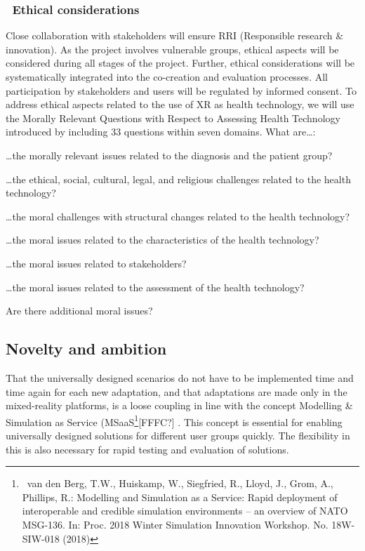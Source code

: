 \subsubsection[\ Ethical considerations]{\ Ethical considerations}
Close collaboration with stakeholders will ensure RRI (Responsible research \& innovation). As the project involves
vulnerable groups, ethical aspects will be considered during all stages of the project. Further, ethical considerations
will be systematically integrated into the co-creation and evaluation processes. All participation by stakeholders and
users will be regulated by informed consent. To address ethical aspects related to the use of XR as health technology,
we will use the Morally Relevant Questions with Respect to Assessing Health Technology introduced by 
\citet{hofmann_droste_oortwijn_cleemput_sacchini_2014}
including 33 questions within seven domains. 
What are\dots: 
\begin{enumerate*}[label={\arabic*.\ },ref=\arabic*]
\item \dots the morally relevant issues related
to the diagnosis and the patient group? 
\item \dots the ethical, social, cultural, legal, and religious challenges related to
the health technology? 
\item \dots the moral challenges with structural changes related to the health technology? 
\item \dots the moral
issues related to the characteristics of the health technology? 
\item \dots the moral issues related to stakeholders? 
\item \dots the
moral issues related to the assessment of the health technology? 
\item Are there additional moral issues?
\end{enumerate*}

\subsection[Novelty and ambition ]{Novelty and ambition }
That the universally designed scenarios do not have to be implemented time and time again for each new adaptation, and
that adaptations are made only in the mixed-reality platforms, is a loose coupling in line with the concept Modelling
\& Simulation as Service (MSaaS\footnote{\ van den Berg, T.W., Huiskamp, W., Siegfried, R., Lloyd, J., Grom, A.,
Phillips, R.: Modelling and Simulation as a Service: Rapid deployment of interoperable and credible simulation
environments – an overview of NATO MSG-136. In: Proc. 2018 Winter Simulation Innovation Workshop. No. 18W-SIW-018
(2018)}[FFFC?] . This concept is essential for enabling universally designed solutions for different user groups
quickly. The flexibility in this is also necessary for rapid testing and evaluation of solutions.

